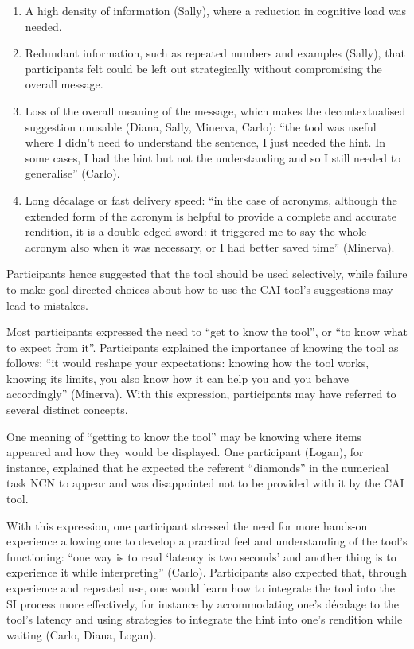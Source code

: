 \begin{enumerate}
    \item A high density of information (Sally), where a reduction in cognitive load was needed.
    \item Redundant information, such as repeated numbers and examples (Sally), that participants felt could be left out strategically without compromising the overall message.
    \item Loss of the overall meaning of the message, which makes the decontextualised suggestion unusable (Diana, Sally, Minerva, Carlo): ``the tool was useful where I didn’t need to understand the sentence, I just needed the hint. In some cases, I had the hint but not the understanding and so I still needed to generalise'' (Carlo).
    \item Long décalage or fast delivery speed: ``in the case of acronyms, although the extended form of the acronym is helpful to provide a complete and accurate rendition, it is a double-edged sword: it triggered me to say the whole acronym also when it was necessary, or I had better saved time'' (Minerva).
\end{enumerate}
Participants hence suggested that the tool should be used selectively, while failure to make goal-directed choices about how to use the CAI tool’s suggestions may lead to mistakes.



Most participants expressed the need to ``get to know the tool'', or ``to know what to expect from it''. Participants explained the importance of knowing the tool as follows: ``it would reshape your expectations: knowing how the tool works, knowing its limits, you also know how it can help you and you behave accordingly'' (Minerva). With this expression, participants may have referred to several distinct concepts.

One meaning of ``getting to know the tool'' may be knowing where items appeared and how they would be displayed. One participant (Logan), for instance, explained that he expected the referent “diamonds” in the numerical task NCN to appear and was disappointed not to be provided with it by the CAI tool.

With this expression, one participant stressed the need for more hands-on experience allowing one to develop a practical feel and understanding of the tool’s functioning: ``one way is to read `latency is two seconds' and another thing is to experience it while interpreting'' (Carlo). Participants also expected that, through experience and repeated use, one would learn how to integrate the tool into the SI process more effectively, for instance by accommodating one’s décalage to the tool’s latency and using strategies to integrate the hint into one’s rendition while waiting (Carlo, Diana, Logan).

